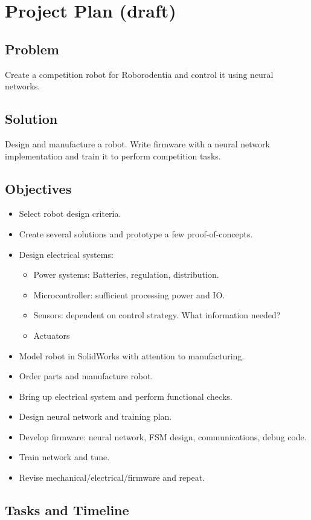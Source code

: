 \documentclass[12pt,letterpaper,titlepage]{report}
\begin{document}
\chapter{Project Plan (draft)}
\section{Problem}
Create a competition robot for Roborodentia and control it using neural networks.

\section{Solution}
Design and manufacture a robot. Write firmware with a neural network implementation and train it to perform competition tasks. 

\section{Objectives}
\begin{itemize}
	\item Select robot design criteria.
	\item Create several solutions and prototype a few proof-of-concepts.
	\item Design electrical systems:
	\begin{itemize}
		\item Power systems: Batteries, regulation, distribution.
		\item Microcontroller: sufficient processing power and IO.
		\item Sensors: dependent on control strategy. What information needed?
		\item Actuators
	\end{itemize}
	\item Model robot in SolidWorks with attention to manufacturing.
	\item Order parts and manufacture robot.
	\item Bring up electrical system and perform functional checks.
	\item Design neural network and training plan.
	\item Develop firmware: neural network, FSM design, communications, debug code.
	\item Train network and tune.
	\item Revise mechanical/electrical/firmware and repeat.
\end{itemize}


\section{Tasks and Timeline}
\end{document}
